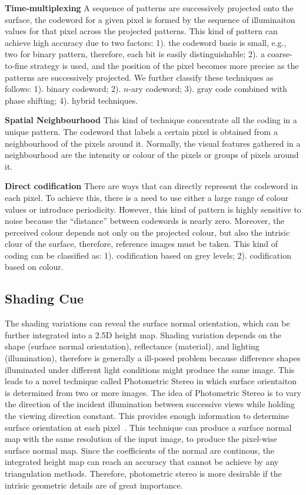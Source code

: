 \textbf{Time-multiplexing} A sequence of patterns are successively projected onto the surface, the codeword for a given pixel is formed by the sequence of illuminaiton values for that pixel across the projected patterns. This kind of pattern can achieve high accuracy due to two factors: 1). the codeword basis is small, e.g., two for binary pattern, therefore, each bit is easily distinguishable; 2). a coarse-to-fine strategy is used, and the position of the pixel becomes more precise as the patterns are successively projected. We further classify these techniques as follows: 1). binary codeword; 2). $n$-ary codeword; 3). gray code combined with phase shifting; 4). hybrid techniques.

\textbf{Spatial Neighbourhood} This kind of technique concentrate all the coding in a unique pattern. The codeword that labels a certain pixel is obtained from a neighbourhood of the pixels around it. Normally, the visual features gathered in a neighbourhood are the intensity or colour of the pixels or groups of pixels around it.

\textbf{Direct codification} There are ways that can directly represent the codeword in each pixel. To achieve this, there is a need to use either a large range of colour values or introduce periodicity. However, this kind of pattern is highly sensitive to noise because the ``distance'' between codewords is nearly zero. Moreover, the perceived colour depends not only on the projected colour, but also the intrisic clour of the surface, therefore, reference images must be taken. This kind of coding can be classified as: 1). codification based on grey levels; 2). codification based on colour.

\subsection{Shading Cue}
The shading variations can reveal the surface normal orientation, which can be further integrated into a 2.5D height map. Shading variation depends on the shape (surface normal orientation), reflectance (material), and lighting (illumination), therefore is generally a ill-posed problem because difference shapes illuminated under different light conditions might produce the same image. This leads to a novel technique called Photometric Stereo in which surface orientaiton is determined from two or more images. The idea of Photometric Stereo is to vary the direction of the incident illumination between successive views while holding the viewing direction constant. This provides enough information to determine surface orientation at each pixel~\cite{woodham1979photometric}. This technique can produce a surface normal map with the same resolution of the input image, \ie to produce the pixel-wise surface normal map. Since the coefficients of the normal are continous, the integrated height map can reach an accuracy that cannot be achieve by any triangulation methods. Therefore, photometric stereo is more desirable if the intrisic geometric details are of great importance.

